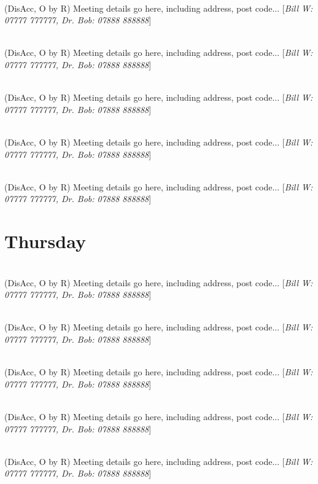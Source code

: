 \documentclass[a4paper]{article}
\newcommand{\mtgname}[1] {\vspace{0.1cm}{\bf #1}\\}   %
\newcommand{\mtgtime}[1] {\hspace{-0.2cm}{\small #1}} %
\newcommand{\mtgdetails}[1] {#1}                      %
\newcommand{\mtgphones}[1] {[\textit{#1}]}            %
\begin{document}
\mtgname{Meeting name goes here}
\mtgtime{12:45--13:45} \mtgdetails{(DisAcc, O by R) Meeting details go here, including address, post code...}
\mtgphones{Bill W: 07777 777777, Dr. Bob: 07888 888888}

\mtgname{Meeting name goes here}
\mtgtime{12:45--13:45} \mtgdetails{(DisAcc, O by R) Meeting details go here, including address, post code...}
\mtgphones{Bill W: 07777 777777, Dr. Bob: 07888 888888}

\mtgname{Meeting name goes here}
\mtgtime{12:45--13:45} \mtgdetails{(DisAcc, O by R) Meeting details go here, including address, post code...}
\mtgphones{Bill W: 07777 777777, Dr. Bob: 07888 888888}

\mtgname{Meeting name goes here}
\mtgtime{12:45--13:45} \mtgdetails{(DisAcc, O by R) Meeting details go here, including address, post code...}
\mtgphones{Bill W: 07777 777777, Dr. Bob: 07888 888888}

\mtgname{Meeting name goes here}
\mtgtime{12:45--13:45} \mtgdetails{(DisAcc, O by R) Meeting details go here, including address, post code...}
\mtgphones{Bill W: 07777 777777, Dr. Bob: 07888 888888}

\section*{Thursday}

\mtgname{Meeting name goes here}
\mtgtime{12:45--13:45} \mtgdetails{(DisAcc, O by R) Meeting details go here, including address, post code...}
\mtgphones{Bill W: 07777 777777, Dr. Bob: 07888 888888}

\mtgname{Meeting name goes here}
\mtgtime{12:45--13:45} \mtgdetails{(DisAcc, O by R) Meeting details go here, including address, post code...}
\mtgphones{Bill W: 07777 777777, Dr. Bob: 07888 888888}

\mtgname{Meeting name goes here}
\mtgtime{12:45--13:45} \mtgdetails{(DisAcc, O by R) Meeting details go here, including address, post code...}
\mtgphones{Bill W: 07777 777777, Dr. Bob: 07888 888888}

\mtgname{Meeting name goes here}
\mtgtime{12:45--13:45} \mtgdetails{(DisAcc, O by R) Meeting details go here, including address, post code...}
\mtgphones{Bill W: 07777 777777, Dr. Bob: 07888 888888}

\mtgname{Meeting name goes here}
\mtgtime{12:45--13:45} \mtgdetails{(DisAcc, O by R) Meeting details go here, including address, post code...}
\mtgphones{Bill W: 07777 777777, Dr. Bob: 07888 888888}
\end{document}
